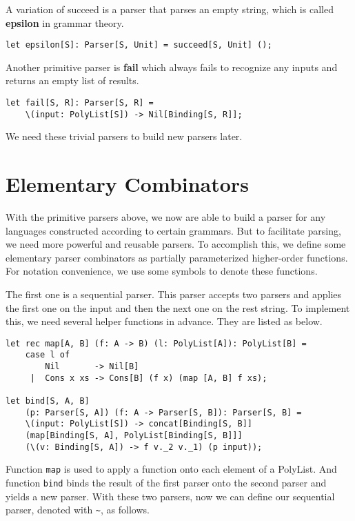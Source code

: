 A variation of succeed is a parser that parses an empty string, which is called \textbf{epsilon} in grammar theory.

\begin{lstlisting}
let epsilon[S]: Parser[S, Unit] = succeed[S, Unit] ();
\end{lstlisting}

Another primitive parser is \textbf{fail} which always fails to recognize any inputs and returns an empty list of results.

\begin{lstlisting}
let fail[S, R]: Parser[S, R] =
	\(input: PolyList[S]) -> Nil[Binding[S, R]];
\end{lstlisting}

We need these trivial parsers to build new parsers later.

\section{Elementary Combinators}
With the primitive parsers above, we now are able to build a parser for any languages constructed according to certain grammars. But to facilitate parsing, we need more powerful and reusable parsers. To accomplish this, we define some elementary parser combinators as partially parameterized higher-order functions. For notation convenience, we use some symbols to denote these functions.

The first one is a sequential parser. This parser accepts two parsers and applies the first one on the input and then the next one on the rest string. To implement this, we need several helper functions in advance. They are listed as below.

\begin{lstlisting}
let rec map[A, B] (f: A -> B) (l: PolyList[A]): PolyList[B] =
    case l of
        Nil       -> Nil[B]
     |  Cons x xs -> Cons[B] (f x) (map [A, B] f xs);

let bind[S, A, B]
    (p: Parser[S, A]) (f: A -> Parser[S, B]): Parser[S, B] =
    \(input: PolyList[S]) -> concat[Binding[S, B]]
    (map[Binding[S, A], PolyList[Binding[S, B]]]
    (\(v: Binding[S, A]) -> f v._2 v._1) (p input));
\end{lstlisting}

Function \texttt{map} is used to apply a function onto each element of a PolyList. And function \texttt{bind} binds the result of the first parser onto the second parser and yields a new parser. With these two parsers, now we can define our sequential parser, denoted with \texttt{\textasciitilde}, as follows.

